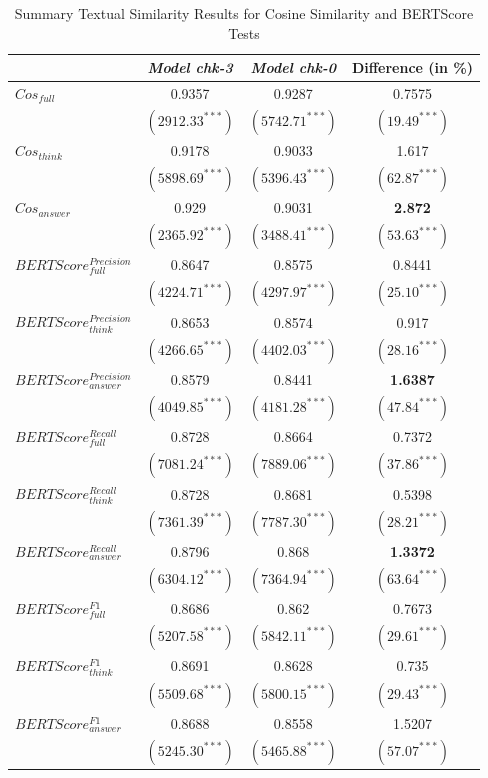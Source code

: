 \begin{table}[htp]
    \centering
    \footnotesize
    \begin{tabular}{l c c c}
        \toprule
        & \textit{Model chk-3}& \textit{Model chk-0}& Difference (in \%)\\
        \hline
        $Cos_{full}$&0.9357&0.9287&0.7575\\ 
                    &$({2912.33}^{***})$&$({5742.71}^{***})$&$({19.49}^{***})$\\ 
        $Cos_{think}$&0.9178&0.9033&1.617\\ 
                    &$({5898.69}^{***})$&$({5396.43}^{***})$&$({62.87}^{***})$\\ 
        $Cos_{answer}$&0.929&0.9031&\textbf{2.872}\\ 
                    &$({2365.92}^{***})$&$({3488.41}^{***})$&$({53.63}^{***})$\\
        \hline
        $BERTScore_{full}^{Precision}$&0.8647&0.8575&0.8441\\ 
                    &$({4224.71}^{***})$&$({4297.97}^{***})$&$({25.10}^{***})$\\ 
        $BERTScore_{think}^{Precision}$&0.8653&0.8574&0.917\\ 
                    &$({4266.65}^{***})$&$({4402.03}^{***})$&$({28.16}^{***})$\\ 
        $BERTScore_{answer}^{Precision}$&0.8579&0.8441&\textbf{1.6387}\\ 
                    &$({4049.85}^{***})$&$({4181.28}^{***})$&$({47.84}^{***})$\\ 

        \hline
        $BERTScore_{full}^{Recall}$&0.8728&0.8664&0.7372\\ 
                    &$({7081.24}^{***})$&$({7889.06}^{***})$&$({37.86}^{***})$\\ 
        $BERTScore_{think}^{Recall}$&0.8728&0.8681&0.5398\\ 
                    &$({7361.39}^{***})$&$({7787.30}^{***})$&$({28.21}^{***})$\\ 
        $BERTScore_{answer}^{Recall}$&0.8796&0.868&\textbf{1.3372}\\ 
                    &$({6304.12}^{***})$&$({7364.94}^{***})$&$({63.64}^{***})$\\ 

        \hline
        $BERTScore_{full}^{F1}$&0.8686&0.862&0.7673\\ 
                    &$({5207.58}^{***})$&$({5842.11}^{***})$&$({29.61}^{***})$\\ 
        $BERTScore_{think}^{F1}$&0.8691&0.8628&0.735\\ 
                    &$({5509.68}^{***})$&$({5800.15}^{***})$&$({29.43}^{***})$\\ 
        $BERTScore_{answer}^{F1}$&0.8688&0.8558&1.5207\\ 
                    &$({5245.30}^{***})$&$({5465.88}^{***})$&$({57.07}^{***})$\\ 
        \bottomrule
    \end{tabular}
    \caption{Summary Textual Similarity Results for Cosine Similarity and BERTScore Tests}
    \label{tab:ch2:result_cos_stage2_synthetic}
\end{table}


